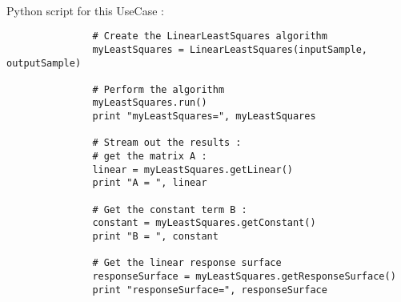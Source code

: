              \textspace\\
             Python  script for this UseCase :

             \begin{lstlisting}
               # Create the LinearLeastSquares algorithm
               myLeastSquares = LinearLeastSquares(inputSample, outputSample)

               # Perform the algorithm
               myLeastSquares.run()
               print "myLeastSquares=", myLeastSquares

               # Stream out the results :
               # get the matrix A :
               linear = myLeastSquares.getLinear()
               print "A = ", linear

               # Get the constant term B :
               constant = myLeastSquares.getConstant()
               print "B = ", constant

               # Get the linear response surface
               responseSurface = myLeastSquares.getResponseSurface()
               print "responseSurface=", responseSurface
             \end{lstlisting}

